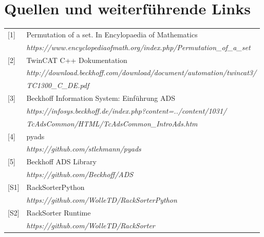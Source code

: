 \documentclass{fh-ium-bama}
\begin{document}
\chapter{Quellen und weiterführende Links}
\begin{tabular}{l l}
{[1]} & Permutation of a set. In Encylopaedia of Mathematics \\
	& \textit{https://www.encyclopediaofmath.org/index.php/Permutation\_of\_a\_set} \\
{[2]} & TwinCAT C++ Dokumentation \\
	& \textit{http://download.beckhoff.com/download/document/automation/twincat3/}\\
	& \textit{TC1300\_C\_DE.pdf} \\
{[3]} & Beckhoff Information System: Einführung ADS \\
	& \textit{https://infosys.beckhoff.de/index.php?content=../content/1031/}\\
	& \textit{TcAdsCommon/HTML/TcAdsCommon\_IntroAds.htm} \\
{[4]} & pyads \\
	& \textit{https://github.com/stlehmann/pyads} \\
{[5]} & Beckhoff ADS Library \\
	& \textit{https://github.com/Beckhoff/ADS} \\
  {[S1]} & RackSorterPython \\
  & \textit{https://github.com/WolleTD/RackSorterPython} \\
  {[S2]} & RackSorter Runtime \\
  & \textit{https://github.com/WolleTD/RackSorter} \\
\end{tabular}
\newpage
\end{document}
